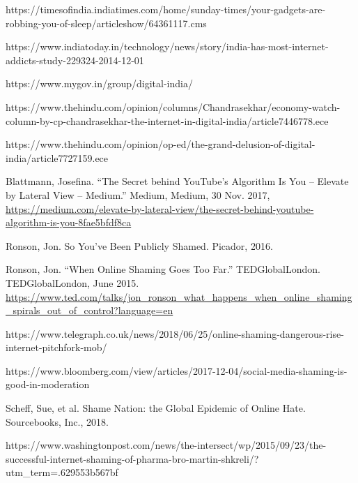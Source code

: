 \documentclass[a4paper, 11pt]{article}
\begin{document}
\begin{thebibliography}{X}
  https://timesofindia.indiatimes.com/home/sunday-times/your-gadgets-are-robbing-you-of-sleep/articleshow/64361117.cms

  https://www.indiatoday.in/technology/news/story/india-has-most-internet-addicts-study-229324-2014-12-01

  https://www.mygov.in/group/digital-india/

  https://www.thehindu.com/opinion/columns/Chandrasekhar/economy-watch-column-by-cp-chandrasekhar-the-internet-in-digital-india/article7446778.ece

  https://www.thehindu.com/opinion/op-ed/the-grand-delusion-of-digital-india/article7727159.ece

  Blattmann, Josefina. “The Secret behind YouTube's Algorithm Is You – Elevate by Lateral View – Medium.” Medium, Medium, 30 Nov. 2017, \href{https://medium.com/elevate-by-lateral-view/the-secret-behind-youtube-algorithm-is-you-8fae5bfdf8ca}{https://medium.com/elevate-by-lateral-view/the-secret-behind-youtube-algorithm-is-you-8fae5bfdf8ca}

  Ronson, Jon. So You've Been Publicly Shamed. Picador, 2016.

  Ronson, Jon. “When Online Shaming Goes Too Far.” TEDGlobalLondon. TEDGlobalLondon, June 2015.
  \href{https://www.ted.com/talks/jon\_ronson\_what\_happens\_when\_online\_shaming\_spirals\_out\_of\_control?language=en}{https://www.ted.com/talks/jon\_ronson\_what\_happens\_when\_online\_shaming\_spirals\_out\_of\_control?language=en}

  https://www.telegraph.co.uk/news/2018/06/25/online-shaming-dangerous-rise-internet-pitchfork-mob/

  https://www.bloomberg.com/view/articles/2017-12-04/social-media-shaming-is-good-in-moderation

  Scheff, Sue, et al. Shame Nation: the Global Epidemic of Online Hate. Sourcebooks, Inc., 2018.

  https://www.washingtonpost.com/news/the-intersect/wp/2015/09/23/the-successful-internet-shaming-of-pharma-bro-martin-shkreli/?utm\_term=.629553b567bf

\end{thebibliography}
\end{document}
